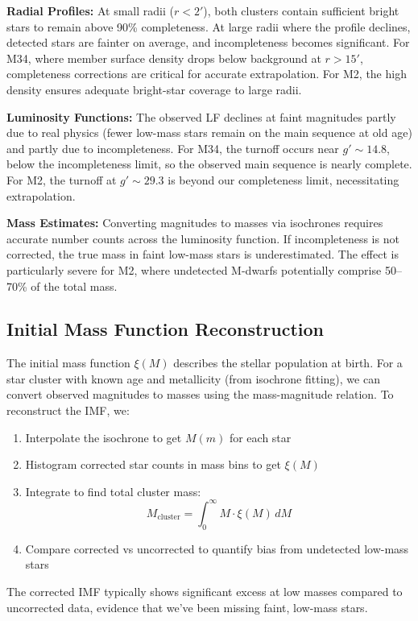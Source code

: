 \documentclass[linenumbers,trackchanges,twocolumn]{aastex701}
\begin{document}
\textbf{Radial Profiles:} At small radii ($r < 2'$), both clusters contain sufficient bright stars to remain above 90\% completeness. At large radii where the profile declines, detected stars are fainter on average, and incompleteness becomes significant. For M34, where member surface density drops below background at $r > 15'$, completeness corrections are critical for accurate extrapolation. For M2, the high density ensures adequate bright-star coverage to large radii.

\textbf{Luminosity Functions:} The observed LF declines at faint magnitudes partly due to real physics (fewer low-mass stars remain on the main sequence at old age) and partly due to incompleteness. For M34, the turnoff occurs near $g' \sim 14.8$, below the incompleteness limit, so the observed main sequence is nearly complete. For M2, the turnoff at $g' \sim 29.3$ is beyond our completeness limit, necessitating extrapolation.

\textbf{Mass Estimates:} Converting magnitudes to masses via isochrones requires accurate number counts across the luminosity function. If incompleteness is not corrected, the true mass in faint low-mass stars is underestimated. The effect is particularly severe for M2, where undetected M-dwarfs potentially comprise 50--70\% of the total mass.

\subsection{Initial Mass Function Reconstruction}
The initial mass function $\xi(M)$ describes the stellar population at birth. For a star cluster with known age and metallicity (from isochrone fitting), we can convert observed magnitudes to masses using the mass-magnitude relation.
To reconstruct the IMF, we:
\begin{enumerate}
    \item Interpolate the isochrone to get $M(m)$ for each star
    \item Histogram corrected star counts in mass bins to get $\xi(M)$
    \item Integrate to find total cluster mass: $$M_\text{cluster} = \int_0^\infty M \cdot \xi(M) \, dM$$
    \item Compare corrected vs uncorrected to quantify bias from undetected low-mass stars
\end{enumerate}
The corrected IMF typically shows significant excess at low masses compared to uncorrected data, evidence that we've been missing faint, low-mass stars.
\end{document}

